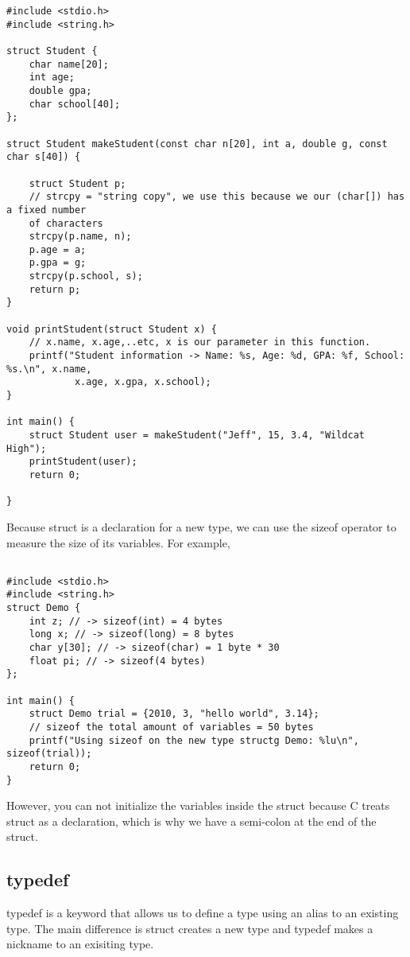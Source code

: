 \documentclass{article}
\begin{document}
\begin{verbatim}
#include <stdio.h>
#include <string.h>

struct Student {
	char name[20];
	int age;
	double gpa;
	char school[40];
};

struct Student makeStudent(const char n[20], int a, double g, const char s[40]) {

	struct Student p;
	// strcpy = "string copy", we use this because we our (char[]) has a fixed number 
	of characters
	strcpy(p.name, n);
	p.age = a;
	p.gpa = g;
	strcpy(p.school, s);
	return p;
}

void printStudent(struct Student x) {
	// x.name, x.age,..etc, x is our parameter in this function.
	printf("Student information -> Name: %s, Age: %d, GPA: %f, School: %s.\n", x.name, 
			x.age, x.gpa, x.school);
}

int main() {
	struct Student user = makeStudent("Jeff", 15, 3.4, "Wildcat High");
	printStudent(user);
	return 0;

}
\end{verbatim}

\noindent Because struct is a declaration for a new type, we can use the sizeof operator to measure the size of its variables. For example, 

\begin{verbatim}

#include <stdio.h>
#include <string.h>
struct Demo {
	int z; // -> sizeof(int) = 4 bytes
	long x; // -> sizeof(long) = 8 bytes
	char y[30]; // -> sizeof(char) = 1 byte * 30
	float pi; // -> sizeof(4 bytes)
};

int main() {
	struct Demo trial = {2010, 3, "hello world", 3.14};
	// sizeof the total amount of variables = 50 bytes
	printf("Using sizeof on the new type structg Demo: %lu\n", sizeof(trial));
	return 0;
}

\end{verbatim}

However, you can not initialize the variables inside the struct because C treats struct as a declaration, which is why we have a semi-colon at the end
of the struct.

\subsection*{typedef}
typedef is a keyword that allows us to define a type using an alias to an existing type. The main difference is struct creates a new type and typedef
makes a nickname to an exisiting type. \\
\end{document}
